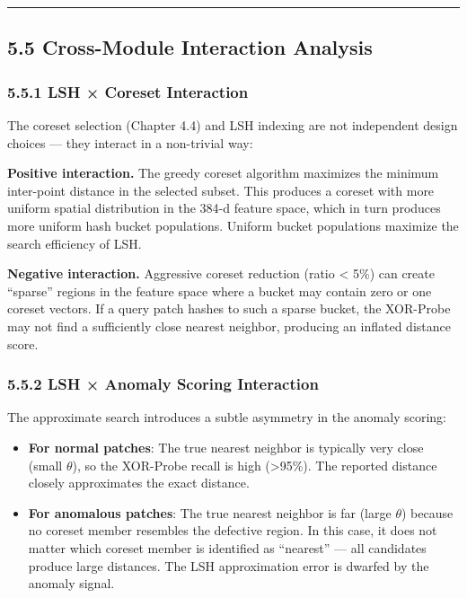 \begin{center}\rule{0.5\linewidth}{0.5pt}\end{center}

\subsection{5.5 Cross-Module Interaction Analysis}\label{cross-module-interaction-analysis}

\subsubsection{5.5.1 LSH × Coreset Interaction}\label{lsh-coreset-interaction}

The coreset selection (Chapter 4.4) and LSH indexing are not independent design choices --- they interact in a non-trivial way:

\textbf{Positive interaction.} The greedy coreset algorithm maximizes the minimum inter-point distance in the selected subset. This produces a coreset with more uniform spatial distribution in the 384-d feature space, which in turn produces more uniform hash bucket populations. Uniform bucket populations maximize the search efficiency of LSH.

\textbf{Negative interaction.} Aggressive coreset reduction (ratio \textless{} 5\%) can create ``sparse'' regions in the feature space where a bucket may contain zero or one coreset vectors. If a query patch hashes to such a sparse bucket, the XOR-Probe may not find a sufficiently close nearest neighbor, producing an inflated distance score.

\subsubsection{5.5.2 LSH × Anomaly Scoring Interaction}\label{lsh-anomaly-scoring-interaction}

The approximate search introduces a subtle asymmetry in the anomaly scoring:

\begin{itemize}
\item
  \textbf{For normal patches}: The true nearest neighbor is typically very close (small \(\theta\)), so the XOR-Probe recall is high (\textgreater95\%). The reported distance closely approximates the exact distance.
\item
  \textbf{For anomalous patches}: The true nearest neighbor is far (large \(\theta\)) because no coreset member resembles the defective region. In this case, it does not matter which coreset member is identified as ``nearest'' --- all candidates produce large distances. The LSH approximation error is dwarfed by the anomaly signal.
\end{itemize}

